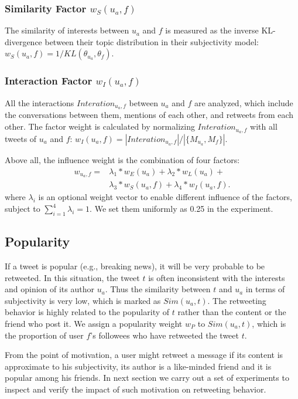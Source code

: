 \documentclass[letterpaper]{article}
\begin{document}
\subsubsection{Similarity Factor $ w_S(u_a,f) $} The similarity of interests between $ u_a $ and $ f $ is measured as the inverse KL-divergence between their topic distribution in their subjectivity model: $ w_S(u_a,f)= 1/KL(\theta_{u_a},\theta_f)$.
\subsubsection{Interaction Factor $ w_I(u_a,f) $} All the interactions $ Interation_{u_a,f} $ between $ u_a $ and $ f $ are analyzed, which include the conversations between them, mentions of each other, and retweets from each other. The factor weight is calculated by normalizing $Interation_{u_a,f}$ with all tweets of $ u_a $ and $ f $: $ w_I(u_a,f)=|Interation_{u_a,f}| /|\{ M_{u_a}, M_f \}| $.

Above all, the influence weight is the combination of four factors:
\begin{equation}
\begin{split}
w_{u_a,f}=& \lambda_1*w_E(u_a)+\lambda_2*w_L(u_a)+\\
   &\lambda_3*w_S(u_a,f)+\lambda_4*w_I(u_a,f). 
\end{split}
\end{equation}
where $ \lambda_i $ is an optional weight vector to enable different influence of the factors,  subject to $ \sum_{i=1}^{4}\lambda_i=1 $. We set them uniformly as 0.25 in the experiment.

\subsection{Popularity}

If a tweet is popular (e.g., breaking news), it will be very probable to be retweeted. In this situation, the tweet $ t $ is often inconsistent with the interests and opinion of its author $ u_a $. Thus the similarity between $ t $ and $ u_a $ in terms of subjectivity is very low, which is marked as $ Sim(u_a,t) $. The retweeting behavior is highly related to the popularity of $ t $ rather than the content or the friend who post it. We assign a popularity weight $ w_P $ to $ Sim(u_a,t) $, which is the proportion of user $ f $'s followees who have retweeted the tweet $ t $.

From the point of motivation, a user might retweet a message if its content is approximate to his subjectivity, its author is a like-minded friend and it is popular among his friends. 
In next section we carry out a set of experiments to inspect and verify the impact of such motivation on retweeting behavior. 
\end{document}

